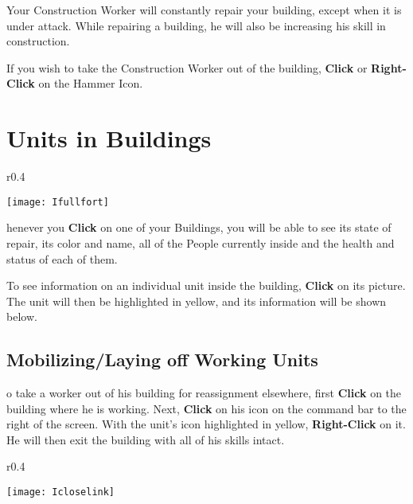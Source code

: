 Your Construction Worker will constantly repair your building, except when it is under attack. While repairing a building, he will also be increasing his skill in construction.

If you wish to take the Construction Worker out of the building, \textbf{Click} or \textbf{Right-Click} on the Hammer Icon.

\section{\textsf{Units in Buildings}}


\begin{wrapfigure}{r}{0.4\textwidth}
    \vspace{-20pt}
    \begin{center}
        \texttt{[image: Ifullfort]} %
    \end{center}
    \vspace{-10pt}
\end{wrapfigure}

henever you \textbf{Click} on one of your Buildings, you will be able to see its state of repair, its color and name, all of the People currently inside and the health and status of each of them.

To see information on an individual unit inside the building, \textbf{Click} on its picture. The unit will then be highlighted in yellow, and its information will be shown below.

\subsection{\textsf{Mobilizing/Laying off Working Units}}


o take a worker out of his building for reassignment elsewhere, first \textbf{Click} on the building where he is working. Next, \textbf{Click} on his icon on the command bar to the right of the screen. With the unit’s icon highlighted in yellow, \textbf{Right-Click} on it. He will then exit the building with all of his skills intact.


\begin{wrapfigure}{r}{0.4\textwidth}
    \vspace{-20pt}
    \begin{center}
        \texttt{[image: Icloselink]} %
    \end{center}
    \vspace{-10pt}
\end{wrapfigure}

